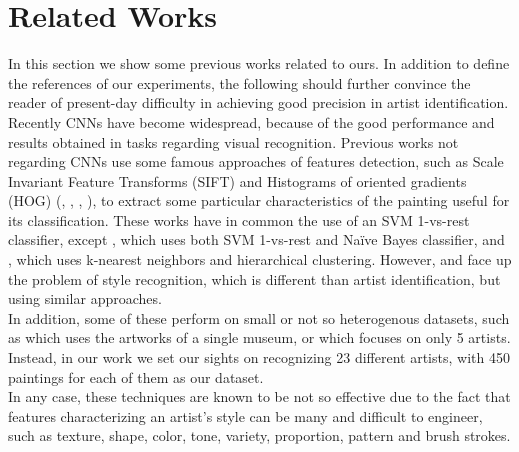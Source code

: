 \documentclass{article}
\begin{document}
\section{Related Works}\label{relwor}

In this section we show some previous works related to ours. In addition to define the references of our experiments, the following should further convince the reader of present-day difficulty in achieving good precision in artist identification.\\
Recently CNNs have become widespread, because of the good performance and results obtained in tasks regarding visual recognition.
Previous works not regarding CNNs use some famous approaches of features detection, such as Scale Invariant Feature Transforms (SIFT) and Histograms of oriented gradients (HOG) (\cite{Saleh2015}, \cite{mensink2014}, \cite{lombardi05}, \cite{jou2011}), to extract some particular characteristics of the painting useful for its classification. These works have in common the use of an SVM 1-vs-rest classifier, except \cite{jou2011}, which uses both SVM 1-vs-rest and Naïve Bayes classifier, and \cite{lombardi05}, which uses k-nearest neighbors and hierarchical clustering. However, \cite{lombardi05} and \cite{jou2011} face up the problem of style recognition, which is different than artist identification, but using similar approaches.\\
In addition, some of these perform on small or not so heterogenous datasets, such as \cite{mensink2014} which uses the artworks of a single museum, or \cite{jou2011} which focuses on only 5 artists. Instead, in our work we set our sights on recognizing 23 different artists, with 450 paintings for each of them as our dataset. \\
In any case, these techniques are known to be not so effective due to the fact that features characterizing an artist's style can be many and difficult to engineer, such as texture, shape, color, tone, variety, proportion, pattern and brush strokes.\\
\end{document}
